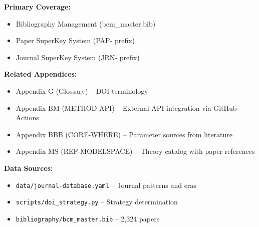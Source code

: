 \begin{tcolorbox}[colback=gray!5, colframe=gray!50, title=Cross-Reference Map]
\small
\textbf{Primary Coverage:}
\begin{itemize}[noitemsep]
    \item Bibliography Management (bcm\_master.bib)
    \item Paper SuperKey System (PAP- prefix)
    \item Journal SuperKey System (JRN- prefix)
\end{itemize}

\textbf{Related Appendices:}
\begin{itemize}[noitemsep]
    \item Appendix G (Glossary) -- DOI terminology
    \item Appendix BM (METHOD-API) -- External API integration via GitHub Actions
    \item Appendix BBB (CORE-WHERE) -- Parameter sources from literature
    \item Appendix MS (REF-MODELSPACE) -- Theory catalog with paper references
\end{itemize}

\textbf{Data Sources:}
\begin{itemize}[noitemsep]
    \item \texttt{data/journal-database.yaml} -- Journal patterns and eras
    \item \texttt{scripts/doi\_strategy.py} -- Strategy determination
    \item \texttt{bibliography/bcm\_master.bib} -- 2,324 papers
\end{itemize}
\end{tcolorbox}

